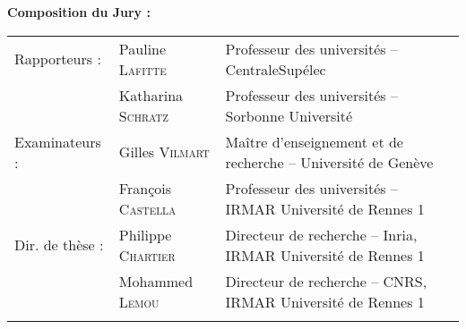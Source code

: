 {\vspace*{.5cm}
\vspace{\baselineskip}
{\normalTwelve \textbf{Composition du Jury :}}\bigskip\\
\footnotesizeTwelve
\renewcommand{\arraystretch}{1.2}
\begin{tabular}{@{}lll}
{\color{gray}Rapporteurs :}           
    & Pauline \textsc{Lafitte} & Professeur des universités -- CentraleSupélec \\
    & Katharina \textsc{Schratz} & Professeur des universités -- Sorbonne Université 
\medskip\\
{\color{gray}Examinateurs :}        
    & Gilles \textsc{Vilmart} & Maître d'enseignement et de recherche -- Université de Genève \\
    & François \textsc{Castella} & Professeur des universités -- IRMAR Université de Rennes 1 
\medskip\\
{\color{gray}Dir. de th\`{e}se :}
    & Philippe \textsc{Chartier} & Directeur de recherche -- Inria, IRMAR Université de Rennes 1 \\
    & Mohammed \textsc{Lemou}    & Directeur de recherche -- CNRS, IRMAR Université de Rennes 1 \\
\vspace*{1cm}
\end{tabular}

}


\maketitle

